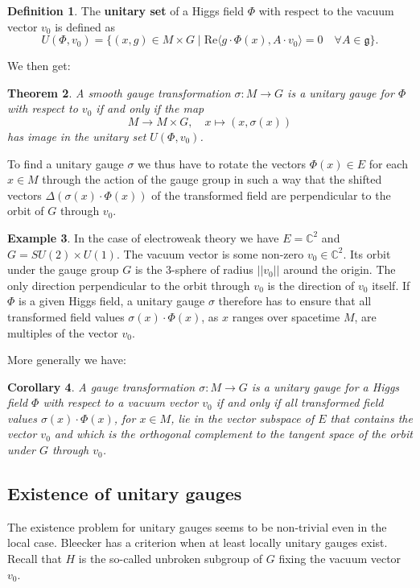 \documentclass[12pt]{amsart}
\newtheorem{thm}{Theorem}[section]
\newtheorem{cor}[thm]{Corollary}
\theoremstyle{definition}
\newtheorem{ex}[thm]{Example}
\newtheorem{defn}[thm]{Definition}
\theoremstyle{remark}
\numberwithin{equation}{section}
\begin{document}
\begin{defn}The {\bf unitary set} of a Higgs field $\Phi$ with respect to the vacuum vector $v_0$ is defined as
\begin{equation*}
U(\Phi,v_0)=\{(x,g)\in M\times G\mid \mathrm{Re}\langle g\cdot\Phi(x), A\cdot v_0\rangle=0\quad\forall A\in\mathfrak{g}\}.
\end{equation*}
\end{defn}
We then get:
\begin{thm}A smooth gauge transformation $\sigma\colon M\rightarrow G$ is a unitary gauge for $\Phi$ with respect to $v_0$ if and only if the map 
\begin{equation*}
M\longrightarrow M\times G,\quad x \longmapsto (x,\sigma(x))
\end{equation*}
has image in the unitary set $U(\Phi,v_0)$.
\end{thm}
To find a unitary gauge $\sigma$ we thus have to rotate the vectors $\Phi(x)\in E$ for each $x\in M$ through the action of the gauge group in such a way that the shifted vectors $\Delta(\sigma(x)\cdot\Phi(x))$ of the transformed field are perpendicular to the orbit of $G$ through $v_0$.
\begin{ex}In the case of electroweak theory we have $E=\mathbb{C}^2$ and $G=SU(2)\times U(1)$. The vacuum vector is some non-zero $v_0\in\mathbb{C}^2$. Its orbit under the gauge group $G$ is the 3-sphere of radius $||v_0||$ around the origin. The only direction perpendicular to the orbit through $v_0$ is the direction of $v_0$ itself. If $\Phi$ is a given Higgs field, a unitary gauge $\sigma$ therefore has to ensure that all transformed field values $\sigma(x)\cdot\Phi(x)$, as $x$ ranges over spacetime $M$, are multiples of the vector $v_0$.
\end{ex}
More generally we have:
\begin{cor}A gauge transformation $\sigma\colon M\rightarrow G$ is a unitary gauge for a Higgs field $\Phi$ with respect to a vacuum vector $v_0$ if and only if all transformed field values $\sigma(x)\cdot\Phi(x)$, for $x\in M$, lie in the vector subspace of $E$ that contains the vector $v_0$ and which is the orthogonal complement to the tangent space of the orbit under $G$ through $v_0$.
\end{cor}

\subsection{Existence of unitary gauges}
The existence problem for unitary gauges seems to be non-trivial even in the local case. Bleecker has a criterion when at least locally unitary gauges exist. Recall that $H$ is the so-called unbroken subgroup of $G$ fixing the vacuum vector $v_0$.
\end{document}
